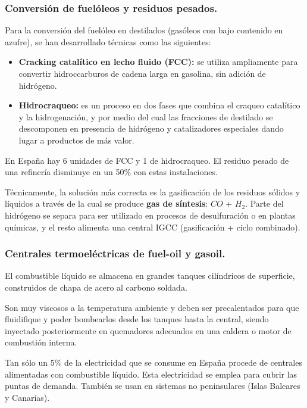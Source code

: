 		\subsubsection{Conversión de fuelóleos y residuos pesados.}
			Para la conversión del fuelóleo en destilados (gasóleos con bajo contenido en azufre), se han
			desarrollado técnicas como las siguientes:
			\begin{itemize}
				\item \textbf{Cracking catalítico en lecho fluido (FCC):} se utiliza ampliamente para convertir hidroccarburos de cadena larga en gasolina, sin adición de hidrógeno.
				\item \textbf{Hidrocraqueo:} es un proceso en dos fases que combina el craqueo catalítico y la
				hidrogenación, y por medio del cual las fracciones de destilado se descomponen en presencia de
				hidrógeno y catalizadores especiales dando lugar a productos de más valor.
			\end{itemize}
			
			
			En España hay 6 unidades de FCC y 1 de hidrocraqueo. El residuo pesado de una refinería disminuye en un 50\% con estas instalaciones.
			
			
			Técnicamente, la solución más correcta es la gasificación de los residuos sólidos y líquidos a través de la cual se produce \textbf{gas de síntesis}: $CO$ + $H_2$. Parte del hidrógeno se separa para ser utilizado en procesos de desulfuración o en plantas químicas, y el resto alimenta una central IGCC (gasificación + ciclo combinado).
			
		\subsubsection{Centrales termoeléctricas de fuel-oil y gasoil.}
			El combustible líquido se almacena en grandes tanques
			cilíndricos de superficie, construidos de chapa de acero
			al carbono soldada.
			
			
			Son muy viscosos a la temperatura ambiente y deben
			ser precalentados para que fluidifique y poder
			bombearlos desde los tanques hasta la central, siendo
			inyectado posteriormente en quemadores adecuados en
			una caldera o motor de combustión interna.
			
			
			Tan sólo un 5\% de la electricidad que se consume en
			España procede de centrales alimentadas con
			combustible líquido. Esta electricidad se emplea para cubrir las puntas de
			demanda. También se usan en sistemas no peninsulares (Islas Baleares y Canarias).
			
